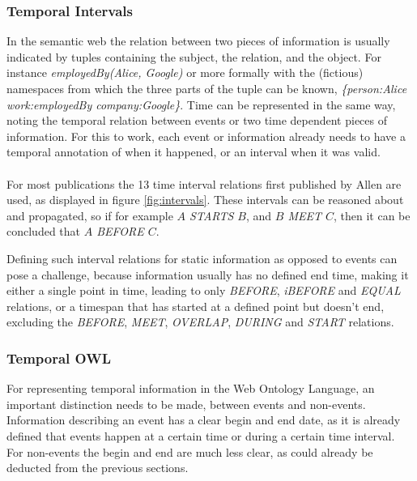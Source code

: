 \documentclass{llncs}
\begin{document}
\subsubsection{Temporal Intervals}
In the semantic web the relation between two pieces of information is usually indicated by tuples containing the subject, the relation, and the object. For instance \emph{employedBy(Alice, Google)} or more formally with the (fictious) namespaces from which the three parts of the tuple can be known, \emph{\{person:Alice work:employedBy company:Google\}}. Time can be represented in the same way, noting the temporal relation between events or two time dependent pieces of information. For this to work, each event or information already needs to have a temporal annotation of when it happened, or an interval when it was valid.\\
\\
For most publications the 13 time interval relations first published by Allen \cite{Allen1989} are used, as displayed in figure \ref{fig:intervals}. These intervals can be reasoned about and propagated, so if for example \emph{$A$ STARTS $B$}, and \emph{$B$ MEET $C$}, then it can be concluded that \emph{$A$ BEFORE $C$}.

Defining such interval relations for static information as opposed to events can pose a challenge, because information usually has no defined end time, making it either a single point in time, leading to only \emph{BEFORE}, \emph{iBEFORE} and \emph{EQUAL} relations, or a timespan that has started at a defined point but doesn't end, excluding the \emph{BEFORE}, \emph{MEET}, \emph{OVERLAP}, \emph{DURING} and \emph{START} relations.

\subsubsection{Temporal OWL}
For representing temporal information in the Web Ontology Language, an important distinction needs to be made, between events and non-events. Information describing an event has a clear begin and end date, as it is already defined that events happen at a certain time or during a certain time interval. For non-events the begin and end are much less clear, as could already be deducted from the previous sections.
\end{document}
